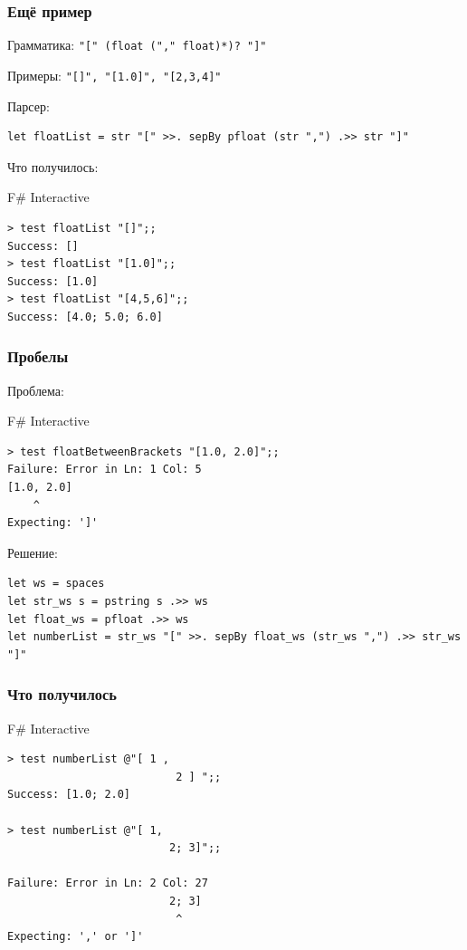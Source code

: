 \documentclass[xetex,mathserif,serif]{beamer}
\begin{document}
	\begin{frame}[fragile]
		\frametitle{Ещё пример}
		Грамматика: \verb|"[" (float ("," float)*)? "]"|
		
		Примеры: \verb|"[]", "[1.0]", "[2,3,4]"|

		Парсер:
		\begin{verbatim}
let floatList = str "[" >>. sepBy pfloat (str ",") .>> str "]"
		\end{verbatim}

		Что получилось:
		\begin{alertblock}{F\# Interactive}
			\begin{verbatim}
> test floatList "[]";;
Success: []
> test floatList "[1.0]";;
Success: [1.0]
> test floatList "[4,5,6]";;
Success: [4.0; 5.0; 6.0]
			\end{verbatim}
		\end{alertblock}
	\end{frame}

	\begin{frame}[fragile]
		\frametitle{Пробелы}
		Проблема:
		\begin{alertblock}{F\# Interactive}
			\begin{verbatim}
> test floatBetweenBrackets "[1.0, 2.0]";;
Failure: Error in Ln: 1 Col: 5
[1.0, 2.0]
    ^
Expecting: ']'
			\end{verbatim}
		\end{alertblock}
		Решение:
		\begin{verbatim}
let ws = spaces
let str_ws s = pstring s .>> ws
let float_ws = pfloat .>> ws
let numberList = str_ws "[" >>. sepBy float_ws (str_ws ",") .>> str_ws "]"
		\end{verbatim}

	\end{frame}

	\begin{frame}[fragile]
		\frametitle{Что получилось}
		\begin{alertblock}{F\# Interactive}
			\begin{verbatim}
> test numberList @"[ 1 ,
                          2 ] ";;
Success: [1.0; 2.0]

> test numberList @"[ 1,
                         2; 3]";;

Failure: Error in Ln: 2 Col: 27
                         2; 3]
                          ^
Expecting: ',' or ']'
			\end{verbatim}
		\end{alertblock}
	\end{frame}
\end{document}
